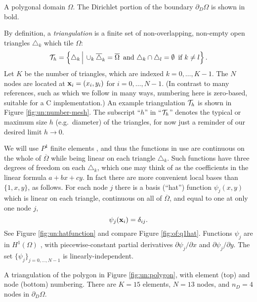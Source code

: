 \begin{marginfigure}

\caption{A polygonal domain $\Omega$.  The Dirichlet portion of the boundary $\partial_D\Omega$ is shown in bold.}
\label{fig:un:polygon}
\end{marginfigure}

By definition, a \emph{triangulation} is a finite set of non-overlapping, non-empty open triangles $\triangle_k$ which tile $\Omega$:
\begin{equation}
\mathcal{T}_h = \left\{\triangle_k \,\Big|\, \cup_k \overline{\triangle}_k = \overline{\Omega} \, \text{ and} \,\, \triangle_k \cap \triangle_l = \emptyset \, \text{ if } k\ne l\right\}. \label{eq:un:triangulation}
\end{equation}
Let $K$ be the number of triangles, which are indexed $k=0,\dots,K-1$.  The $N$ nodes are located at $\mathbf{x}_i=(x_i,y_i)$ for $i=0,\dots,N-1$.  (In contrast to many references, such as \citet{Elmanetal2005} which we follow in many ways, numbering here is zero-based, suitable for a C implementation.)  An example triangulation $\mathcal{T}_h$ is shown in Figure \ref{fig:un:number-mesh}.  The subscript ``$h$'' in ``$\mathcal{T}_h$'' denotes the typical or maximum size $h$ (e.g.~diameter) of the triangles, for now just a reminder of our desired limit $h\to 0$.  

We will use $P^1$ finite elements \citep{Elmanetal2005}, and thus the functions in use are continuous on the whole of $\overline\Omega$ while being linear on each triangle $\triangle_k$.  Such functions have three degrees of freedom on each $\triangle_k$, which one may think of as the coefficients in the linear formula $a + b x + c y$.  In fact there are more convenient local bases than $\{1,x,y\}$, as follows.  For each node $j$ there is a basis (``hat'') function  $\psi_j(x,y)$ which is linear on each triangle, continuous on all of $\overline{\Omega}$, and equal to one at only one node $j$,
\begin{equation*}
\psi_j(\mathbf{x}_i) = \delta_{ij}.
\end{equation*}
See Figure \ref{fig:un:hatfunction} and compare Figure \ref{fig:of:q1hat}.  Functions $\psi_j$ are in $H^1(\Omega)$ \citep{Braess2007}, with piecewise-constant partial derivatives $\partial\psi_j/\partial x$ and $\partial\psi_j/\partial y$.  The set $\{\psi_j\}_{j=0,\dots,N-1}$ is linearly-independent.

\begin{marginfigure}


\medskip


\caption{A triangulation of the polygon in Figure \ref{fig:un:polygon}, with element (top) and node (bottom) numbering.  There are $K=15$ elements, $N=13$ nodes, and $n_D=4$ nodes in $\partial_D\Omega$.}
\label{fig:un:number-mesh}
\end{marginfigure}

